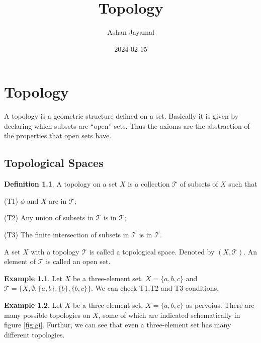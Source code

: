 \documentclass[
]{book}
\title{Topology}
\author{Ashan Jayamal}
\date{2024-02-15}
\theoremstyle{definition}
\newtheorem{definition}{Definition}[chapter]
\theoremstyle{definition}
\newtheorem{example}{Example}[chapter]
\theoremstyle{definition}
\theoremstyle{definition}
\theoremstyle{remark}
\begin{document}
\maketitle

{
\setcounter{tocdepth}{1}
\tableofcontents
}
\hypertarget{topology}{%
\chapter{Topology}\label{topology}}

A topology is a geometric structure defined on a set. Basically it is given by declaring which subsets are ``open'' sets. Thus the axioms are the abstraction of the properties that open sets have.

\hypertarget{topological-spaces}{%
\section{Topological Spaces}\label{topological-spaces}}

\begin{definition}
\protect\hypertarget{def:Top}{}\label{def:Top}A topology on a set \(X\) is a collection \(\mathcal{T}\) of subsets of \(X\) such that

(T1) \(\phi\) and \(X\) are in \(\mathcal{T}\);

(T2) Any union of subsets in \(\mathcal{T}\) is in \(\mathcal{T}\);

(T3) The finite intersection of subsets in \(\mathcal{T}\) is in \(\mathcal{T}\).
\end{definition}

A set \(X\) with a topology \(\mathcal{T}\) is called a topological space. Denoted by \((X,\mathcal{T})\). An element of \(\mathcal{T}\) is called an open set.

\begin{example}
\protect\hypertarget{exm:unnamed-chunk-1}{}\label{exm:unnamed-chunk-1}Let \(X\) be a three-element set, \(X = \{a, b, c\}\) and \(\mathcal{T}=\{X, \emptyset,\{a, b\}, \{b\}, \{b, c\}\}\). We can check T1,T2 and T3 conditions.
\end{example}

\begin{example}
\protect\hypertarget{exm:unnamed-chunk-2}{}\label{exm:unnamed-chunk-2}Let \(X\) be a three-element set, \(X = \{a, b, c\}\) as pervoius. There are many possible topologies on \(X\), some of which are indicated schematically in figure \ref{fig:gi}. Furthur, we can see that even a three-element set has many different topologies.
\end{example}
\end{document}
